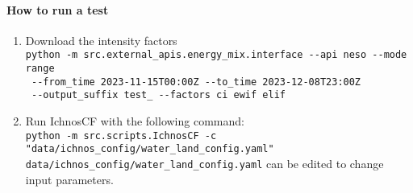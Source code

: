 \documentclass{article}
\begin{document}
\paragraph{How to run a test}
\begin{enumerate}
    \item Download the intensity factors\\ 
    \verb|python -m src.external_apis.energy_mix.interface --api neso --mode range|\\\verb| --from_time 2023-11-15T00:00Z --to_time 2023-12-08T23:00Z |\\\verb| --output_suffix test_ --factors ci ewif elif|\\
    \item Run IchnosCF with the following command:\\
    \verb|python -m src.scripts.IchnosCF -c "data/ichnos_config/water_land_config.yaml"|
    \\
    \verb|data/ichnos_config/water_land_config.yaml| can be edited to change input parameters.
\end{enumerate}
\end{document}
